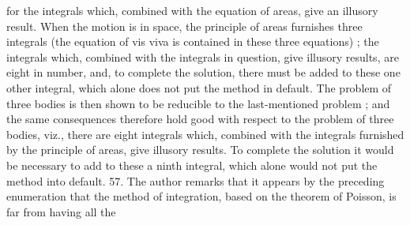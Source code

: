 \documentclass[11pt,a4paper]{book}
\begin{document}
for the
integrals which, combined
with
the
equation
of areas,
give an
illusory
result.
When
the
motion
is
in
space,
the
principle
of
areas
furnishes
three
integrals
(the
equation
of
vis
viva
is
contained
in
these
three
equations)
;
the
integrals
which, combined
with
the
integrals
in
question,
give
illusory
results,
are
eight
in
number,
and,
to
complete
the
solution,
there
must
be
added
to
these one
other
integral,
which
alone
does not put the method
in
default.
The
problem
of
three
bodies
is
then
shown
to
be
reducible
to
the
last-mentioned
problem
;
and
the
same
consequences
therefore
hold good
with
respect
to
the problem
of
three
bodies,
viz.,
there
are
eight
integrals
which,
combined
with
the
integrals
furnished
by the
principle
of
areas,
give
illusory
results.
To
complete
the
solution
it
would
be
necessary
to add
to
these
a
ninth
integral, which
alone
would
not
put
the
method into
default.
57.
The
author
remarks
that
it
appears
by
the
preceding
enumeration
that
the
method
of
integration,
based
on
the
theorem
of
Poisson,
is
far
from
having
all
the

\end{document}

